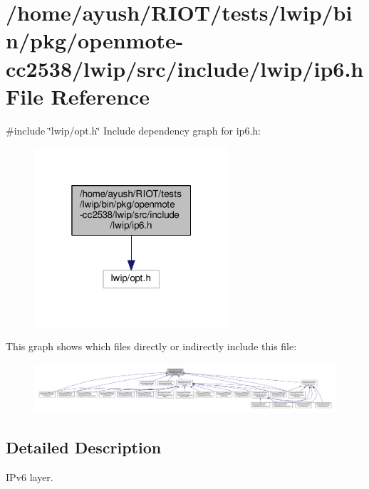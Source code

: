 \hypertarget{openmote-cc2538_2lwip_2src_2include_2lwip_2ip6_8h}{}\section{/home/ayush/\+R\+I\+O\+T/tests/lwip/bin/pkg/openmote-\/cc2538/lwip/src/include/lwip/ip6.h File Reference}
\label{openmote-cc2538_2lwip_2src_2include_2lwip_2ip6_8h}
{\ttfamily \#include \char`\"{}lwip/opt.\+h\char`\"{}}\newline
Include dependency graph for ip6.\+h\+:
\nopagebreak
\begin{figure}[H]
\begin{center}
\leavevmode
\includegraphics[width=205pt]{openmote-cc2538_2lwip_2src_2include_2lwip_2ip6_8h__incl}
\end{center}
\end{figure}
This graph shows which files directly or indirectly include this file\+:
\nopagebreak
\begin{figure}[H]
\begin{center}
\leavevmode
\includegraphics[width=350pt]{openmote-cc2538_2lwip_2src_2include_2lwip_2ip6_8h__dep__incl}
\end{center}
\end{figure}


\subsection{Detailed Description}
I\+Pv6 layer. 